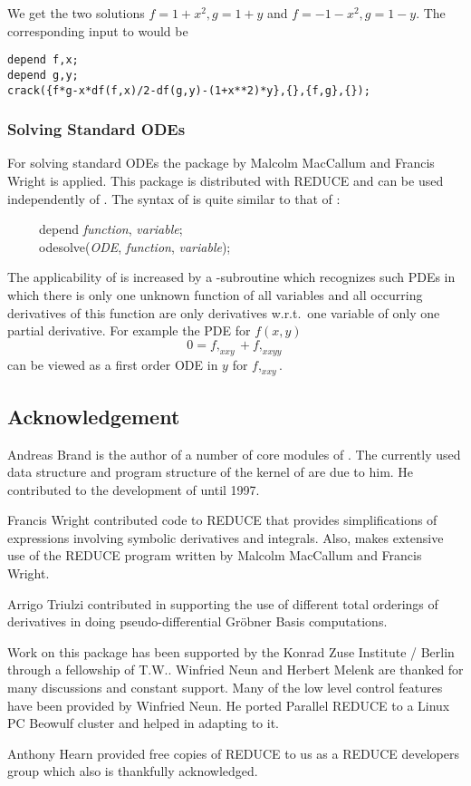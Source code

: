 We get the two solutions $f = 1 + x^2, g = 1 + y$ and $f = - 1 - x^2,
g = 1 - y$.  The corresponding input to  would be
\begin{verbatim}
depend f,x;
depend g,y;
crack({f*g-x*df(f,x)/2-df(g,y)-(1+x**2)*y},{},{f,g},{});
\end{verbatim}

\subsubsection{Solving Standard ODEs}

For solving standard ODEs the package  by Malcolm
MacCallum and Francis Wright \cite{MacCallum:1989} is applied.  This
package is distributed with REDUCE and can be used independently of
.  The syntax of  is quite similar to
that of :
\begin{flushleft}\ttfamily
~~~~~depend \textit{function}, \textit{variable}; \\
~~~~~odesolve(\textit{ODE}, \textit{function}, \textit{variable});
\end{flushleft}
The applicability of  is increased by a
-subroutine which recognizes such PDEs in which there
is only one unknown function of all variables and all occurring
derivatives of this function are only derivatives w.r.t.\ one variable
of only one partial derivative.  For example the PDE for $f(x,y)$
\[ 0 = f,_{xxy} + f,_{xxyy} \]
can be viewed as a first order ODE in $y$ for $f,_{xxy}$.

\subsection*{Acknowledgement}

Andreas Brand is the author of a number of core modules of
.  The currently used data structure and program
structure of the kernel of  are due to him.  He
contributed to the development of  until 1997.

Francis Wright contributed code to REDUCE that provides
simplifications of expressions involving symbolic derivatives and
integrals.  Also,  makes extensive use of the REDUCE
program  written by Malcolm MacCallum and Francis
Wright.

Arrigo Triulzi contributed in supporting the use of different total
orderings of derivatives in doing pseudo-differential Gr\"{o}bner
Basis computations.

Work on this package has been supported by the Konrad Zuse Institute /
Berlin through a fellowship of T.W..  Winfried Neun and Herbert Melenk
are thanked for many discussions and constant support.  Many of the
low level control features have been provided by Winfried Neun.  He
ported Parallel REDUCE to a Linux PC Beowulf cluster and helped in
adapting  to it.

Anthony Hearn provided free copies of REDUCE to us as a REDUCE
developers group which also is thankfully acknowledged.
